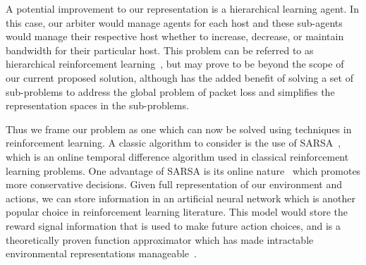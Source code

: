 A potential improvement to our representation is a hierarchical learning agent. 
In this case, our arbiter would manage agents for each host and these 
sub-agents would manage their respective host whether to increase, decrease, or 
maintain bandwidth for their particular host. This problem can be referred to 
as hierarchical reinforcement learning~\cite{Borga1993}, but may prove to be 
beyond the scope of our current proposed solution, although has the added 
benefit of solving a set of sub-problems to address the global problem of 
packet loss and simplifies the representation spaces in the sub-problems.

Thus we frame our problem as one which can now be solved using techniques in 
reinforcement learning. A classic algorithm to consider is the use of 
SARSA~\cite{Sutton:1998:IRL:551283}, which is an online temporal difference 
algorithm used in classical reinforcement learning problems. One advantage of 
SARSA is its online nature~\cite{Sutton:1998:IRL:551283} which promotes more 
conservative decisions. Given full representation of our environment and 
actions, we can store information in an artificial neural network which is 
another popular choice in reinforcement learning literature. This model would 
store the reward signal information that is used to make future action choices, 
and is a theoretically proven function approximator which has made intractable 
environmental representations manageable~\cite{Sutton:1998:IRL:551283}.



